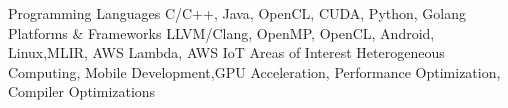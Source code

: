 \begin{cventries}
    \vspace{-1.3em}
    \cvskill
    {Programming Languages}
    {C/C++, Java, OpenCL, CUDA, Python, Golang}
    \cvskill
    {Platforms \& Frameworks}
    {LLVM/Clang, OpenMP, OpenCL, Android, Linux,\linebreak MLIR, AWS Lambda, AWS IoT}
    \cvskill
    {Areas of Interest}
    {Heterogeneous Computing, Mobile Development,\linebreak GPU Acceleration, Performance Optimization, \linebreak Compiler Optimizations}
\end{cventries}
